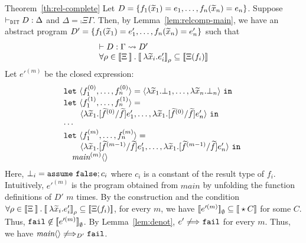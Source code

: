 \begin{pfof}{Theorem~\ref{th:rel-complete}}
Let \(D = \{f_1(\widetilde{x}_1) = e_1,\ldots,f_n(\widetilde{x}_n)=e_n\}\).
Suppose \(\vdash_{\texttt{DIT}} D : \Delta\) and \(\Delta= \comp{\Xi}{\Gamma}\). 
Then, by Lemma~\ref{lem:relcomp-main}, we have an abstract program
\(D' = \{f_1(\widetilde{x}_1)=e_1',\ldots, f_n(\widetilde{x}_n)=e_n'\}\) such that
\[
\begin{array}{l}
\vdash D : \Gamma \leadsto D'\\
\forall \rho\in\mathbin{[\![}\Xi\mathbin{]\!]}.\mathbin{[\![}\lambda \widetilde{x}_i.e'_i\mathbin{]\!]}_{\rho} \subseteq \mathbin{[\![}\Xi(f_i)\mathbin{]\!]}
\end{array}
\]
Let \(e'^{(m)}\) be the closed expression:
\[
\begin{array}{l}
\mathtt{let~}\langle{f_1^{(0)},\ldots,f_n^{(0)}}\rangle=\langle{\lambda \widetilde{x}_1.\bot_1,\ldots,\lambda \widetilde{x}_n.\bot_n}\rangle\mathtt{~in~}\\
\mathtt{let~}\langle{f_1^{(1)},\ldots,f_n^{(1)}}\rangle=\\\qquad\langle{\lambda \widetilde{x}_1.[\widetilde{f}^{(0)}/\widetilde{f}]e_1',\ldots,\lambda \widetilde{x}_1.[\widetilde{f}^{(0)}/\widetilde{f}]e_n'}\rangle\mathtt{~in~}\\
\cdots \\
\mathtt{let~}\langle{f_1^{(m)},\ldots,f_n^{(m)}}\rangle=\\\qquad\langle{\lambda \widetilde{x}_1.[\widetilde{f}^{(m-1)}/\widetilde{f}]e_1',\ldots,\lambda \widetilde{x}_1.[\widetilde{f}^{(m-1)}/\widetilde{f}]e_n'}\rangle\mathtt{~in~}\\
\quad \textit{main}^{(m)}\langle{}\rangle
\end{array}
\]
Here, \(\bot_i= \mathtt{assume~}\mathtt{false}; c_i\) where \(c_i\) is a constant of the result type of \(f_i\).
Intuitively, \(e'^{(m)}\) is the program obtained from \(\textit{main}\) by unfolding the function definitions of \(D'\)
\(m\) times.
By the construction and the condition
\(\forall \rho\in\mathbin{[\![}\Xi\mathbin{]\!]}.\mathbin{[\![}\lambda \widetilde{x}_i.e'_i\mathbin{]\!]}_{\rho} \subseteq \mathbin{[\![}\Xi(f_i)\mathbin{]\!]}\),
for every \(m\), we have \(\mathbin{[\![}e'^{(m)}\mathbin{]\!]}_{\emptyset} \subseteq \mathbin{[\![}\star{C}\mathbin{]\!]}\) for some \(C\).
Thus, \(\mathtt{fail}\not\in \mathbin{[\![}e'^{(m)}\mathbin{]\!]}_{\emptyset}\).
By Lemma~\ref{lem:denot}, \(e'\not\stackrel{}{\Longrightarrow}_{}{}\mathtt{fail}\) for every \(m\).
Thus, we have \(\textit{main}\langle{}\rangle \not\stackrel{}{\Longrightarrow}_{D'} \mathtt{fail}\).
\end{pfof}
